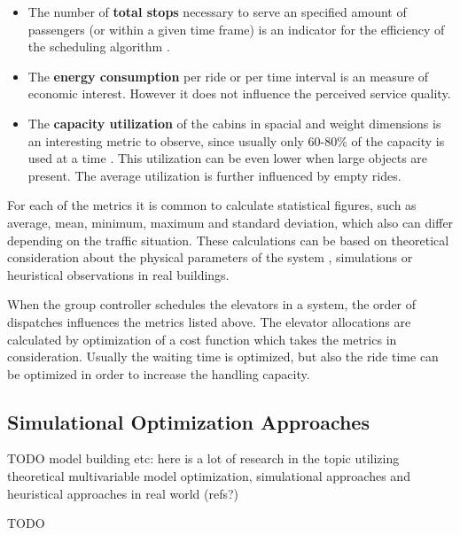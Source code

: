 \begin{itemize}
    \item The number of \textbf{total stops}
        necessary to serve an specified amount of passengers (or within a given time frame) is an indicator for the efficiency of the scheduling algorithm
        \autocite[][p.~194]{unger2015aufzuege}.
    
    \item The \textbf{energy consumption} 
        per ride or per time interval is an measure of economic interest. 
        However it does not influence the perceived service quality.
    
    \item The \textbf{capacity utilization} 
        of the cabins in spacial and weight dimensions is an interesting metric to observe, 
        since usually only 60-80\% of the capacity is used at a time 
        \autocite[][p.~194]{unger2015aufzuege}
        \autocite[][p.~7]{hakonen2003simulation}.
        This utilization can be even lower when large objects are present.
        The average utilization is further influenced by empty rides.
        
\end{itemize}

For each of the metrics it is common to calculate statistical figures, such as average, mean, minimum, maximum and standard deviation, which also can differ depending on the traffic situation.
These calculations can be based on theoretical consideration about the physical parameters of the system \autocite[][p.~194]{unger2015aufzuege}, simulations or heuristical observations in real buildings.
 
When the group controller schedules the elevators in a system, the order of dispatches influences the metrics listed above.
The elevator allocations are calculated by optimization of a cost function which takes the metrics in consideration.
Usually the waiting time is optimized, but also the ride time can be optimized in order to increase the handling capacity. \autocite[][p.~10]{siikonen1997models} 

\subsection{Simulational Optimization Approaches}
TODO
model building etc: here is a lot of research in the topic utilizing theoretical multivariable model optimization, simulational approaches and heuristical approaches in real world (refs?)

\autocite[][pp.~7--11]{beers2015arrivals}
\autocite[][p.~193]{unger2015aufzuege}


TODO
